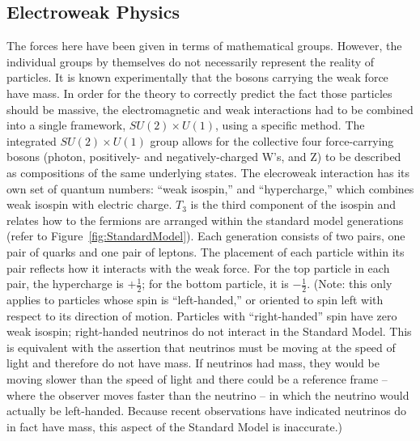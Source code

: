 \subsection{Electroweak Physics}
The forces here have been given in terms 
of mathematical groups.  
However, the individual groups by themselves 
do not necessarily represent the reality of particles.  
It is known experimentally that the bosons carrying 
the weak force have mass.  
In order for the theory to correctly predict the 
fact those particles should be massive, 
the electromagnetic and weak interactions had to be combined 
into a single framework, 
$SU(2) \times U(1)$, using a specific method.  
The integrated $SU(2) \times U(1)$ group 
allows for the collective four force-carrying bosons 
(photon, positively- and negatively-charged W's, and Z) 
to be described as compositions of the same underlying states.  
The elecroweak interaction has its own set of quantum 
numbers: ``weak isospin,'' and ``hypercharge,'' 
which combines weak isospin with electric charge.  
$T_3$ is the third component of the isospin 
and relates how to the fermions are arranged 
within the standard model generations 
(refer to Figure~\ref{fig:StandardModel}).  
Each generation consists of two pairs, 
one pair of quarks and one pair of leptons.  
The placement of each particle within its pair 
reflects how it interacts with the weak force.  
For the top particle in each pair, the hypercharge 
is $+\frac{1}{2}$; 
for the bottom particle, it is $-\frac{1}{2}$.  
(Note: this only applies to particles whose spin 
is ``left-handed,'' 
or oriented to spin left with respect to its direction of motion.  
Particles with ``right-handed'' spin have zero weak isospin; 
right-handed neutrinos do not interact in the Standard Model.  
This is equivalent with the assertion that neutrinos 
must be moving at the speed of light and therefore 
do not have mass. 
If neutrinos had mass, 
they would be moving slower than the speed of light 
and there could be a reference frame -- 
where the observer moves faster than the neutrino -- 
in which the neutrino would actually be left-handed.  
Because recent observations have indicated neutrinos %
do in fact have mass, 
this aspect of the Standard Model is inaccurate.)  

